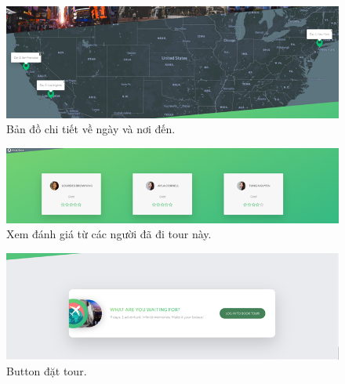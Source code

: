 \vspace{15cm}



\begin{figure}[ht]
    \centering
    \includegraphics[width = 1.2\linewidth]{figures/demo/bando.png}
    \caption{Bản đồ chi tiết về ngày và nơi đến.}
    \label{fig:example_1}
\end{figure}


\begin{figure}[ht]
    \centering
    \includegraphics[width = 1.2\linewidth]{figures/demo/5.png}
    \caption{Xem đánh giá từ các người đã đi tour này.}
    \label{fig:example_1}
\end{figure}

\vspace{10cm}


\begin{figure}[ht]
    \centering
    \includegraphics[width = 1.2\linewidth]{figures/demo/6.png}
    \caption{Button đặt tour.}
    \label{fig:example_1}
\end{figure}

